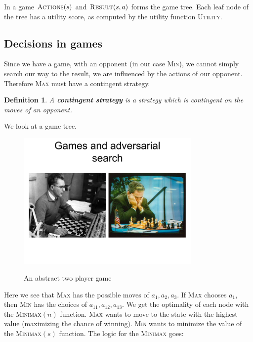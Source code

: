 \documentclass{article}
\newtheorem{definition}{Definition}[section]
\begin{document}
In a game $\textsc{Actions}(s)$ and $\textsc{Result}(s,a)$ forms the game tree.
Each leaf node of the tree has a utility score, as computed by the utility
function \textsc{Utility}.


\subsection{Decisions in games}%
\label{sub:decisions_in_games}

Since we have a game, with an opponent (in our case \textsc{Min}), we cannot
simply search our way to the result, we are influenced by the actions of our
opponent. Therefore \textsc{Max} must have a contingent strategy.

\begin{definition}
  A \textbf{contingent strategy} is a strategy which is contingent on the moves
  of an opponent.
\end{definition}

We look at a game tree.

\begin{figure}[H]
  \centering
  \includegraphics[page=9,
  width=0.8\textwidth]{../presentations/w11_lec06_adversarial_search_sanja_2021.pdf}
  \label{fig:simple_game}
  \caption{An abstract two player game \cite[p.
  9]{presentation:games_and_adversarial_search}}
\end{figure}

Here we see that \textsc{Max} has the possible moves of $a_1, a_2, a_3$. If
\textsc{Max} chooses $a_1$, then \textsc{Min} has the choices of $a_{11},
a_{12}, a_{13}$. We get the optimality of each node with the
\textsc{Minimax}$(n)$ function. \textsc{Max} wants to move to the state with the
highest value (maximizing the chance of winning). \textsc{Min} wants to minimize
the value of the \textsc{Minimax}$(s)$ function. The logic for the
\textsc{Minimax} goes:
\end{document}
